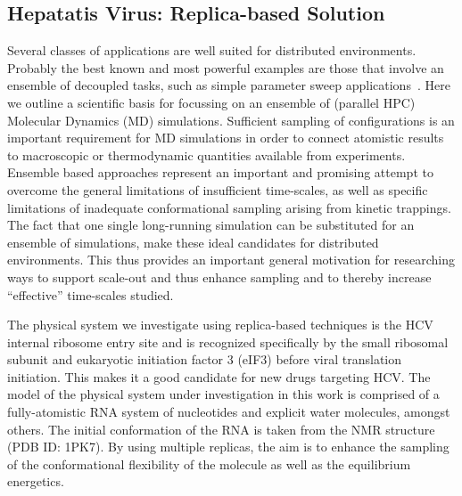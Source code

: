 \documentclass[conference,final]{IEEEtran}
\newcommand{\up}{\vspace*{-1em}}
\begin{document}


\subsection{Hepatatis Virus: Replica-based Solution}
\up
Several classes of applications are well suited for distributed
environments. Probably the best known and most powerful examples are
those that involve an ensemble of decoupled tasks, such as simple
parameter sweep applications~\cite{1239909}. Here we outline a
scientific basis for focussing on an ensemble of (parallel HPC)
Molecular Dynamics (MD) simulations.  Sufficient sampling of
configurations is an important requirement for MD simulations in order
to connect atomistic results to macroscopic or thermodynamic
quantities available from experiments.  Ensemble based approaches
represent an important and promising attempt to overcome the general
limitations of insufficient time-scales, as well as specific
limitations of inadequate conformational sampling arising from kinetic
trappings.  The fact that one single long-running simulation can be
substituted for an ensemble of simulations, make these ideal
candidates for distributed environments.  This thus provides an
important general motivation for researching ways to support scale-out
and thus enhance sampling and to thereby increase ``effective''
time-scales studied.

The physical system we investigate using replica-based techniques is
the HCV internal ribosome entry site and is recognized specifically by
the small ribosomal subunit and eukaryotic initiation factor 3 (eIF3)
before viral translation initiation.  This makes it a good candidate
for new drugs targeting HCV.  The model of the physical system under
investigation in this work is comprised of a fully-atomistic RNA
system of nucleotides and explicit water molecules, amongst
others. The initial conformation of the RNA is taken from the NMR
structure (PDB ID: 1PK7).  By using multiple replicas, the aim is to
enhance the sampling of the conformational flexibility of the molecule
as well as the equilibrium energetics.

\end{document}
